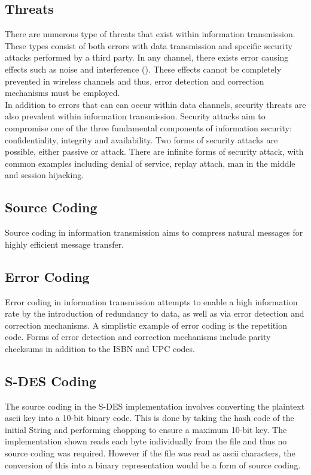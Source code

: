 \documentclass[]{article}
\begin{document}
\subsection*{Threats}

There are numerous type of threats that exist within information transmission. These types consist of both errors with data transmission and specific security attacks performed by a third party. In any channel, there exists error causing effects such as noise and interference (\cite{lecture}). These effects cannot be completely prevented in wireless channels and thus, error detection and correction mechanisms must be employed.\\

In addition to errors that can can occur within data channels, security threats are also prevalent within information transmission. Security attacks aim to compromise one of the three fundamental components of information security: confidentiality, integrity and availability. Two forms of security attacks are possible, either passive or attack. There are infinite forms of security attack, with common examples including denial of service, replay attach, man in the middle and session hijacking.

\subsection*{Source Coding}

Source coding in information transmission aims to compress natural messages for highly efficient message transfer.

\subsection*{Error Coding}

Error coding in information transmission attempts to enable a high information rate by the introduction of redundancy to data, as well as via error detection and correction mechanisms. A simplistic example of error coding is the repetition code. Forms of error detection and correction mechanisms include parity checksums in addition to the ISBN and UPC codes.

\subsection*{S-DES Coding}

The source coding in the S-DES implementation involves converting the plaintext ascii key into a 10-bit binary code. This is done by taking the hash code of the initial String and performing chopping to ensure a maximum 10-bit key. The implementation shown reads each byte individually from the file and thus no source coding was required. However if the file was read as ascii characters, the conversion of this into a binary representation would be a form of source coding.\\
\end{document}
